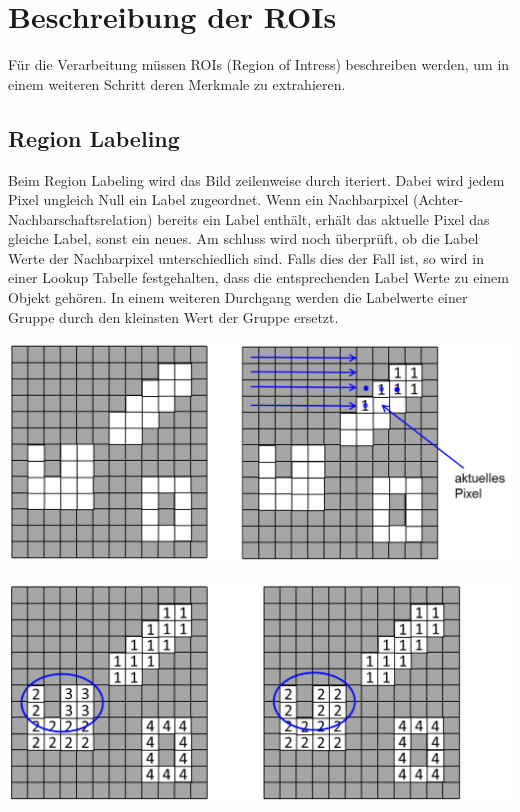 \section{Beschreibung der ROIs}
Für die Verarbeitung müssen ROIs (Region of Intress) beschreiben werden, um in einem weiteren Schritt deren Merkmale zu extrahieren.

\subsection{Region Labeling}
Beim Region Labeling wird das Bild zeilenweise durch iteriert.
Dabei wird jedem Pixel ungleich Null ein Label zugeordnet.
Wenn ein Nachbarpixel (Achter-Nachbarschaftsrelation) bereits ein Label enthält, erhält das aktuelle Pixel das gleiche Label, sonst ein neues.
Am schluss wird noch überprüft, ob die Label Werte der Nachbarpixel unterschiedlich sind.
Falls dies der Fall ist, so wird in einer Lookup Tabelle festgehalten, 
dass die entsprechenden Label Werte zu einem Objekt gehören.
In einem weiteren Durchgang werden die Labelwerte einer Gruppe durch den kleinsten Wert der Gruppe ersetzt.
\begin{center}
	\includegraphics[scale=.5]{./images/labeling.png}
\end{center}
\begin{center}
	\includegraphics[scale=.5]{./images/labeling2.png}
\end{center}

